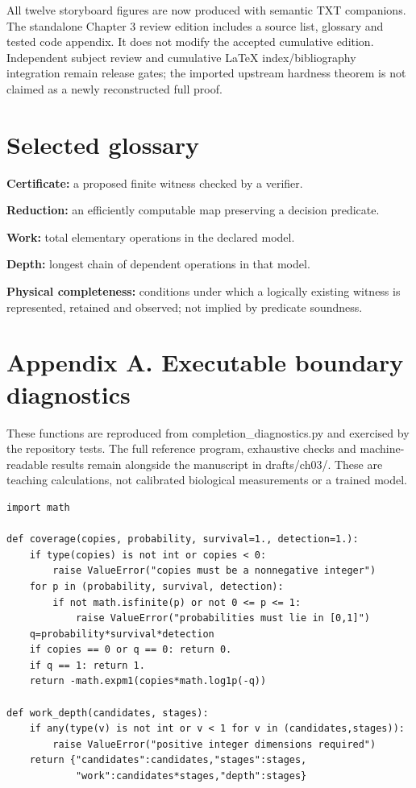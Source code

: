 All twelve storyboard figures are now produced with semantic TXT
companions. The standalone Chapter 3 review edition includes a source
list, glossary and tested code appendix. It does not modify the accepted
cumulative edition. Independent subject review and cumulative LaTeX
index/bibliography integration remain release gates; the imported
upstream hardness theorem is not claimed as a newly reconstructed full
proof.

\section{Selected glossary}\label{selected-glossary}

\textbf{Certificate:} a proposed finite witness checked by a verifier.

\textbf{Reduction:} an efficiently computable map preserving a decision
predicate.

\textbf{Work:} total elementary operations in the declared model.

\textbf{Depth:} longest chain of dependent operations in that model.

\textbf{Physical completeness:} conditions under which a logically
existing witness is represented, retained and observed; not implied by
predicate soundness.

\section{Appendix A. Executable boundary
diagnostics}\label{appendix-a.-executable-boundary-diagnostics}

These functions are reproduced from completion\_diagnostics.py and
exercised by the repository tests. The full reference program,
exhaustive checks and machine-readable results remain alongside the
manuscript in drafts/ch03/. These are teaching calculations, not
calibrated biological measurements or a trained model.

\begin{verbatim}
import math

def coverage(copies, probability, survival=1., detection=1.):
    if type(copies) is not int or copies < 0:
        raise ValueError("copies must be a nonnegative integer")
    for p in (probability, survival, detection):
        if not math.isfinite(p) or not 0 <= p <= 1:
            raise ValueError("probabilities must lie in [0,1]")
    q=probability*survival*detection
    if copies == 0 or q == 0: return 0.
    if q == 1: return 1.
    return -math.expm1(copies*math.log1p(-q))

def work_depth(candidates, stages):
    if any(type(v) is not int or v < 1 for v in (candidates,stages)):
        raise ValueError("positive integer dimensions required")
    return {"candidates":candidates,"stages":stages,
            "work":candidates*stages,"depth":stages}
\end{verbatim}

